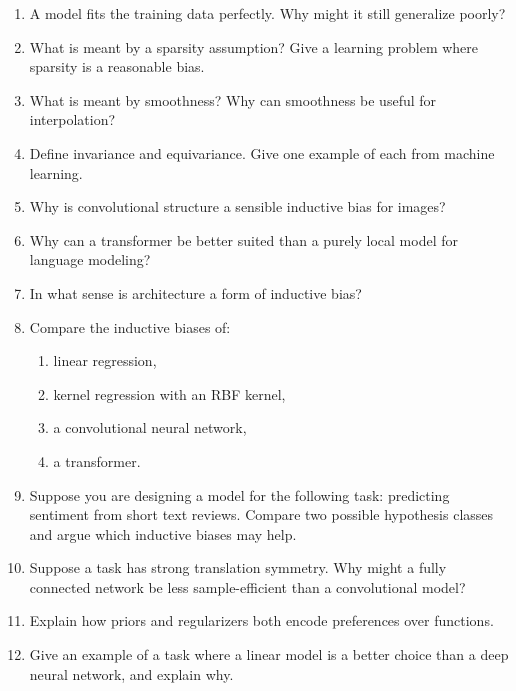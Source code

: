 \begin{enumerate}
    \item A model fits the training data perfectly. Why might it still generalize poorly?

    \item What is meant by a sparsity assumption? Give a learning problem where sparsity is a reasonable bias.

    \item What is meant by smoothness? Why can smoothness be useful for interpolation?

    \item Define invariance and equivariance. Give one example of each from machine learning.

    \item Why is convolutional structure a sensible inductive bias for images?

    \item Why can a transformer be better suited than a purely local model for language modeling?

    \item In what sense is architecture a form of inductive bias?

    \item Compare the inductive biases of:
    \begin{enumerate}
        \item linear regression,
        \item kernel regression with an RBF kernel,
        \item a convolutional neural network,
        \item a transformer.
    \end{enumerate}

    \item Suppose you are designing a model for the following task: predicting sentiment from short text reviews. Compare two possible hypothesis classes and argue which inductive biases may help.

    \item Suppose a task has strong translation symmetry. Why might a fully connected network be less sample-efficient than a convolutional model?

    \item Explain how priors and regularizers both encode preferences over functions.

    \item Give an example of a task where a linear model is a better choice than a deep neural network, and explain why.


\end{enumerate}
